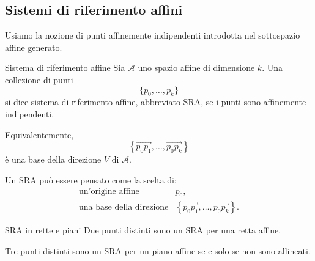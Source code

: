 \documentclass[a4paper]{article}
\begin{document}
\subsection{Sistemi di riferimento affini}

Usiamo la nozione di punti affinemente indipendenti introdotta nel sottospazio affine generato.

\begin{snippetdefinition}{Sistema di riferimento affine}
    Sia \(\mathcal{A}\) uno spazio affine di dimensione \(k\). Una collezione di punti
    \[
        \{p_0,\ldots,p_k\}
    \]
    si dice sistema di riferimento affine, abbreviato SRA, se i punti sono affinemente indipendenti.

    Equivalentemente,
    \[
        \left\{
            \overrightarrow{p_0p_1},
            \ldots,
            \overrightarrow{p_0p_k}
        \right\}
    \]
    è una base della direzione \(V\) di \(\mathcal{A}\).
\end{snippetdefinition}

Un SRA può essere pensato come la scelta di:
\[
    \begin{array}{ll}
        \text{un'origine affine} & p_0,\\
        \text{una base della direzione} &
        \left\{
            \overrightarrow{p_0p_1},
            \ldots,
            \overrightarrow{p_0p_k}
        \right\}.
    \end{array}
\]

\begin{snippetexample}{SRA in rette e piani}
    Due punti distinti sono un SRA per una retta affine.

    Tre punti distinti sono un SRA per un piano affine se e solo se non sono allineati.
\end{snippetexample}

\begin{center}
\end{center}
\end{document}
